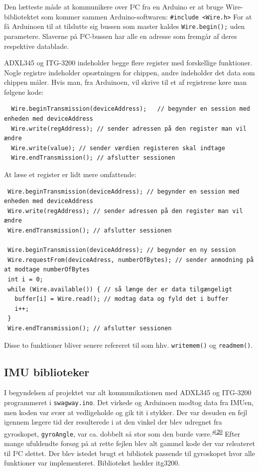 \documentclass[a4paper,11pt,oneside,article,danish,table]{memoir}
\newcommand{\issue}[1]{\textsuperscript{\textcolor{blue!80!black}{\href{https://github.com/neic/Swagway/issues/#1}{\##1}}}}
\begin{document}
Den lætteste måde at kommunikere over I²C fra en Arduino er at bruge Wire-bibliotektet som kommer sammen Arduino-softwaren: \lstinline{#include <Wire.h>} For at få Arduinoen til at tilslutte sig bussen som master kaldes \lstinline{Wire.begin();} uden parametere. Slaverne på I²C-bussen har alle en adresse som fremgår af deres respektive datablade.

ADXL345 og ITG-3200 indeholder begge flere register med forskellige funktioner. Nogle registre indeholder opsætningen for chippen, andre indeholder det data som chippen måler. Hvis man, fra Arduinoen, vil skrive til et af registrene køre man følgene kode:
\begin{lstlisting}
  Wire.beginTransmission(deviceAddress);   // begynder en session med enheden med deviceAddress
  Wire.write(regAddress); // sender adressen på den register man vil ændre
  Wire.write(value); // sender værdien registeren skal indtage
  Wire.endTransmission(); // afslutter sessionen
\end{lstlisting}

At læse et register er lidt mere omfattende:
\begin{lstlisting}
 Wire.beginTransmission(deviceAddress); // begynder en session med enheden med deviceAddress
 Wire.write(regAddress); // sender adressen på den register man vil ændre
 Wire.endTransmission(); // afslutter sessionen
  
 Wire.beginTransmission(deviceAddress); // begynder en ny session
 Wire.requestFrom(deviceAdress, numberOfBytes); // sender anmodning på at modtage numberOfBytes
 int i = 0; 
 while (Wire.available()) { // så længe der er data tilgængeligt
   buffer[i] = Wire.read(); // modtag data og fyld det i buffer
   i++;
 }
 Wire.endTransmission(); // afslutter sessionen
\end{lstlisting}

Disse to funktioner bliver senere refereret til som hhv. \lstinline{writemem()} og \lstinline{readmem()}.


\subsection{IMU biblioteker}
I begyndelsen af projektet var alt kommunikationen med ADXL345 og ITG-3200 programmeret i \texttt{swagway.ino}. Det virkede og Arduinoen modtog data fra IMUen, men koden var svær at vedligeholde og gik tit i stykker. Der var desuden en fejl igennem lægere tid der resulterede i at den vinkel der blev udregnet fra gyroskopet, \lstinline{gyroAngle}, var ca. dobbelt så stor som den burde være.\issue{20} Efter mange ufuldendte forsøg på at rette fejlen blev alt gammel kode der var releateret til I²C slettet. Der blev istedet brugt et bibliotek passende til gyroskopet hvor alle funktioner var implementeret. Biblioteket hedder itg3200.
\end{document}
